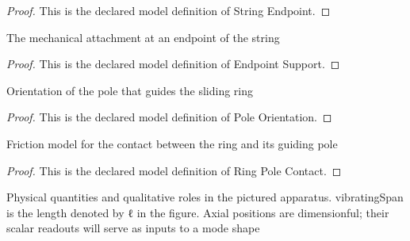 \begin{proof}
  This is the declared model definition of String Endpoint.
\end{proof}
\begin{definition}
  \label{def:physics:phyx-mini-0208:phyxminiproblems-problemphyxmini0208-endpointsupport}
  The mechanical attachment at an endpoint of the string
\end{definition}
\begin{proof}
  This is the declared model definition of Endpoint Support.
\end{proof}
\begin{definition}
  \label{def:physics:phyx-mini-0208:phyxminiproblems-problemphyxmini0208-poleorientation}
  Orientation of the pole that guides the sliding ring
\end{definition}
\begin{proof}
  This is the declared model definition of Pole Orientation.
\end{proof}
\begin{definition}
  \label{def:physics:phyx-mini-0208:phyxminiproblems-problemphyxmini0208-ringpolecontact}
  Friction model for the contact between the ring and its guiding pole
\end{definition}
\begin{proof}
  This is the declared model definition of Ring Pole Contact.
\end{proof}
\begin{definition}
  \label{def:physics:phyx-mini-0208:phyxminiproblems-problemphyxmini0208-fixedfreestringsetup}
  Physical quantities and qualitative roles in the pictured apparatus. vibratingSpan is the length denoted by ℓ in the figure. Axial positions are dimensionful; their scalar readouts will serve as inputs to a mode shape
\end{definition}
